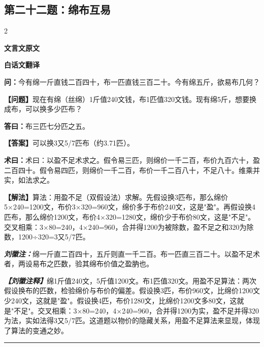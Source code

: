 \documentclass[10pt,a4paper]{article}
\newcommand{\wen}[1]{\textbf{\color{problemcolor}问：}#1\par}
\newcommand{\da}[1]{\textbf{答曰：}#1\par}
\newcommand{\shu}[1]{\textbf{术曰：}#1\par}
\newcommand{\liuhui}[1]{{\color{commentarycolor}\textit{\textbf{刘徽注：}}#1\par}}
\newcommand{\classicalheader}[1]{{\centering\large\bfseries\color{classicalcolor} #1\par\vspace{0.5em}}}
\newcommand{\wenmodern}[1]{\textbf{\color{moderncolor}【问题】}#1\par}
\newcommand{\damodern}[1]{\textbf{【答案】}#1\par}
\newcommand{\shumodern}[1]{\textbf{【解法】}#1\par}
\newcommand{\liuhuimodern}[1]{{\color{commentarycolor}\textit{\textbf{【刘徽注释】}}#1\par}}
\newcommand{\modernheader}[1]{{\centering\large\bfseries\color{moderncolor} #1\par\vspace{0.5em}}}
\newcommand{\problemsec}[1]{\subsection*{#1}}
\begin{document}
\problemsec{第二十二题：绵布互易}
\begin{paracol}{2}
\classicalheader{文言文原文}
\switchcolumn
\modernheader{白话文翻译}
\switchcolumn*

\wen{今有绵一斤直钱二百四十，布一匹直钱三百二十。今有绵五斤，欲易布几何？}

\switchcolumn

\wenmodern{现在有绵（丝绵）1斤值240文钱，布1匹值320文钱。现有绵5斤，想要换成布，可以换多少匹布？}

\switchcolumn*

\da{布三匹七分匹之五。}

\switchcolumn

\damodern{可以换3又5/7匹布（约3.71匹）。}

\switchcolumn*

\shu{术曰：以盈不足术求之。假令易三匹，则绵价一千二百，布价九百六十，盈二百四十。假令易四匹，则绵价一千二百，布价一千二百八十，不足八十。维乘并实，如法求之。}

\switchcolumn

\shumodern{算法：用盈不足（双假设法）求解。先假设换3匹布，那么绵价5×240=1200文，布价3×320=960文，绵价多于布价240文，这是"盈"。再假设换4匹布，那么绵价1200文，布价4×320=1280文，绵价少于布价80文，这是"不足"。交叉相乘：3×80=240，4×240=960，合并得1200为被除数，盈不足之和320为除数，1200÷320=3又5/7匹。}

\switchcolumn*

\liuhui{绵一斤直二百四十，五斤则直一千二百。布一匹直三百二十。以盈不足术者，两设易布之匹数，验其绵布价值之盈肭也。}

\switchcolumn

\liuhuimodern{绵1斤值240文，5斤值1200文。布1匹值320文。用盈不足算法：两次假设换布的匹数，检验绵价与布价的偏差。假设换3匹，布价960文，比绵价1200文少240文，这就是"盈"。假设换4匹，布价1280文，比绵价1200文多80文，这就是"不足"。交叉相乘：3×80=240，4×240=960，合并得1200为实，盈不足并得320为法，实如法得3又5/7匹。这道题以物价的隐藏关系，用盈不足算法来显现，体现了算法的变通之妙。}

\end{paracol}

\vspace{0.3cm}
\hrule
\vspace{0.3cm}
\end{document}
